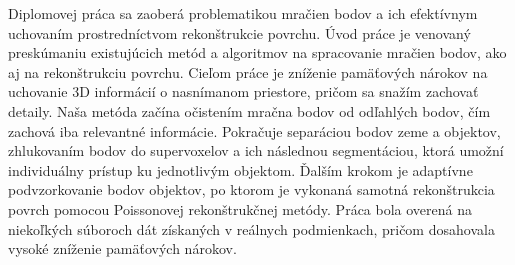 Diplomovej práca sa zaoberá problematikou mračien bodov a ich efektívnym uchovaním prostredníctvom rekonštrukcie povrchu. Úvod práce je venovaný preskúmaniu existujúcich metód a algoritmov na spracovanie mračien bodov, ako aj na rekonštrukciu povrchu. Cieľom práce je zníženie pamäťových nárokov na uchovanie 3D informácií o nasnímanom priestore, pričom sa snažím zachovať detaily. Naša metóda začína očistením mračna bodov od odľahlých bodov, čím zachová iba relevantné informácie. Pokračuje separáciou bodov zeme a objektov, zhlukovaním bodov do supervoxelov a ich následnou segmentáciou, ktorá umožní individuálny prístup ku jednotlivým objektom. Ďalším krokom je adaptívne podvzorkovanie bodov objektov, po ktorom je vykonaná samotná rekonštrukcia povrch pomocou Poissonovej rekonštrukčnej metódy. Práca bola overená na niekoľkých súboroch dát získaných v reálnych podmienkach, pričom dosahovala vysoké zníženie pamäťových nárokov. 